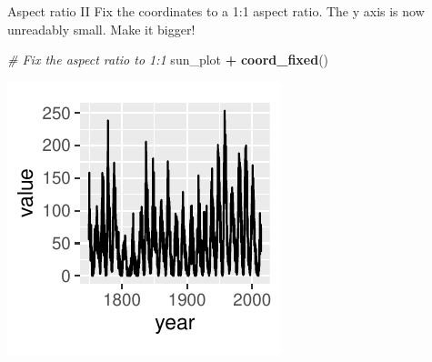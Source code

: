 \documentclass[
  ignorenonframetext,
]{beamer}
\newenvironment{Shaded}{\begin{snugshade}}{\end{snugshade}}
\newcommand{\CommentTok}[1]{\textcolor[rgb]{0.56,0.35,0.01}{\textit{#1}}}
\newcommand{\FunctionTok}[1]{\textcolor[rgb]{0.13,0.29,0.53}{\textbf{#1}}}
\newcommand{\NormalTok}[1]{#1}
\newcommand{\SpecialCharTok}[1]{\textcolor[rgb]{0.81,0.36,0.00}{\textbf{#1}}}
\begin{document}
\begin{frame}[fragile]{Aspect ratio II}
\label{aspect-ratio-ii-4}
Fix the coordinates to a 1:1 aspect ratio. The y axis is now unreadably
small. Make it bigger!


\begin{Shaded}
\begin{Highlighting}[]
\CommentTok{\# Fix the aspect ratio to 1:1}
\NormalTok{sun\_plot }\SpecialCharTok{+} \FunctionTok{coord\_fixed}\NormalTok{()}
\end{Highlighting}
\end{Shaded}

\begin{center}\includegraphics[width=0.5\linewidth]{Figs/unnamed-chunk-44-1} \end{center}
\end{frame}
\end{document}
